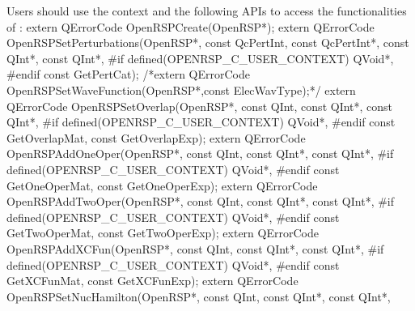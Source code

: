 Users should use the \LibName context and the following APIs to access the
functionalities of \LibName:
\nwenddocs{}\endmoddef
extern QErrorCode OpenRSPCreate(OpenRSP*);
extern QErrorCode OpenRSPSetPerturbations(OpenRSP*,
                                          const QcPertInt,
                                          const QcPertInt*,
                                          const QInt*,
                                          const QInt*,
#if defined(OPENRSP_C_USER_CONTEXT)
                                          QVoid*,
#endif
                                          const GetPertCat);
/*extern QErrorCode OpenRSPSetWaveFunction(OpenRSP*,const ElecWavType);*/
extern QErrorCode OpenRSPSetOverlap(OpenRSP*,
                                    const QInt,
                                    const QInt*,
                                    const QInt*,
#if defined(OPENRSP_C_USER_CONTEXT)
                                    QVoid*,
#endif
                                    const GetOverlapMat,
                                    const GetOverlapExp);
extern QErrorCode OpenRSPAddOneOper(OpenRSP*,
                                    const QInt,
                                    const QInt*,
                                    const QInt*,
#if defined(OPENRSP_C_USER_CONTEXT)
                                    QVoid*,
#endif
                                    const GetOneOperMat,
                                    const GetOneOperExp);
extern QErrorCode OpenRSPAddTwoOper(OpenRSP*,
                                    const QInt,
                                    const QInt*,
                                    const QInt*,
#if defined(OPENRSP_C_USER_CONTEXT)
                                    QVoid*,
#endif
                                    const GetTwoOperMat,
                                    const GetTwoOperExp);
extern QErrorCode OpenRSPAddXCFun(OpenRSP*,
                                  const QInt,
                                  const QInt*,
                                  const QInt*,
#if defined(OPENRSP_C_USER_CONTEXT)
                                  QVoid*,
#endif
                                  const GetXCFunMat,
                                  const GetXCFunExp);
extern QErrorCode OpenRSPSetNucHamilton(OpenRSP*,
                                        const QInt,
                                        const QInt*,
                                        const QInt*,
